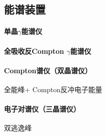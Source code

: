 \subsection{\gammaray 能谱装置}

\paragraph{单晶$\gamma$能谱仪}

\paragraph{全吸收反Compton $\gamma$能谱仪}

\paragraph{Compton谱仪（双晶谱仪）}
全能峰+ Compton反冲电子能量
\paragraph{电子对谱仪（三晶谱仪）}
双逃逸峰

